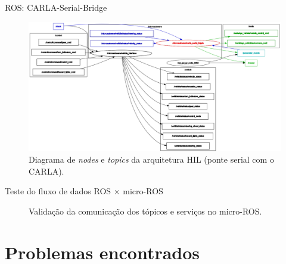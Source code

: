 \documentclass{if-beamer}
\begin{document}
\begin{frame}{ROS: CARLA-Serial-Bridge}

\begin{figure}[H]
	\centering
	\includegraphics[width=0.95\linewidth]{ros_graph_serial}
	\caption{Diagrama de \textit{nodes} e \textit{topics} da arquitetura HIL (ponte serial com o CARLA).}
	\label{fig:ros_graph_serial}
\end{figure}

\end{frame}


\begin{frame}{Teste do fluxo de dados ROS $\times$ micro-ROS}

\begin{figure}[H]
	\centering
	\caption{Validação da comunicação dos tópicos e serviços no micro-ROS.}
	\label{fig:teste_micro}
\end{figure}

\end{frame}

\section{Problemas encontrados}
\end{document}
